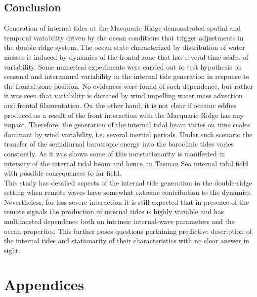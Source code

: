 \documentclass[12pt]{article}
\begin{document}
\subsection{Conclusion}
Generation of internal tides at the Macquarie Ridge demonstrated spatial and temporal variability 
driven by the ocean conditions that trigger 
adjustments in the double-ridge system. The ocean state characterized by distribution 
of water masses is induced by dynamics of the frontal zone that has several time scales of 
variability. 
Some numerical experiments were carried out to test hypothesis on seasonal and interannual 
variability in the internal tide generation in response to the frontal zone position. No evidences 
were found of such dependence, but rather it was seen that variability is dictated by wind 
impelling water mass advection and frontal filamentation. On the other hand, it is not clear if 
oceanic eddies produced as a result of the front interaction with the Macquarie Ridge has any 
impact. Therefore, the generation of the internal tidal beam varies on time scales dominant by 
wind variability, i.e. several inertial periods. Under such scenario the transfer of the 
semidiurnal barotropic energy into the baroclinic tides varies constantly. As it was shown some 
of this nonstationarity is manifested in intensity of the internal tidal beam and hence, in Tasman 
Sea internal tidal field with possible consequences to far field.\\

This study has detailed aspects of the internal tide generation in the double-ridge setting when 
remote waves have somewhat extreme contribution to the dynamics. Nevertheless, for less severe 
interaction it is still expected that in presence of the remote signals the production of internal 
tides is highly variable and has multifaceted dependence both on intrinsic internal-wave parameters 
and the ocean properties. This further poses questions pertaining predictive description of the 
internal tides and stationarity of their characteristics with no clear answer in sight.

\section*{Appendices}

\renewcommand{\thesubsection}{\Alph{subsection}}
\setcounter{subsection}{0}
\end{document}
